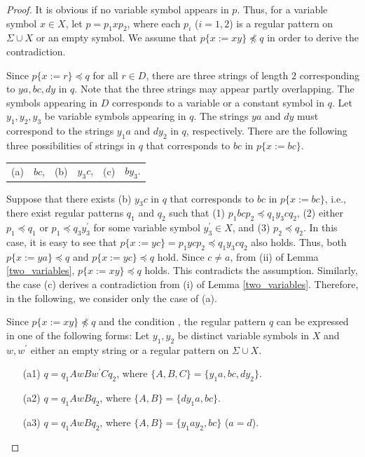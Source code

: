   \begin{proof}
  It is obvious if no variable symbol appears in $p$.
  Thus, for a variable symbol $x\in X$, let $p=p_{1}xp_{2}$, where each $p_{i}$ ($i=1,2$) is a regular pattern on $\Sigma\cup X$ or an empty symbol.
  We assume that $p \{ x := xy \} \not \preceq q$ in order to derive the contradiction.

  Since $p \{ x := r \} \preceq q$ for all $r \in D$, there are three strings of length $2$ corresponding to $ya, bc, dy$ in $q$.
  Note that the three strings may appear partly overlapping.
  The symbols appearing in $D$ corresponds to a variable or a constant symbol in $q$.
  Let $y_{1}, y_{2}, y_{3}$ be variable symbols appearing in $q$.
  The strings $ya$ and $dy$ must correspond to the strings $y_{1}a$ and $dy_{2}$ in $q$, respectively.
  There are the following three possibilities of strings in $q$ that corresponds to $bc$ in $p\{x:=bc\}$.
  \begin{center}
    \begin{tabular}{cccccc}
      \textrm{(a)} & $bc$, & \textrm{(b)} & $y_{3}c$, & \textrm{(c)} & $by_{3}$.
    \end{tabular}
  \end{center}

  Suppose that there exists (b) $y_{3}c$ in $q$ that corresponds to $bc$ in $p\{x:=bc\}$, i.e., there exist regular patterns $q_{1}$ and $q_{2}$ such that (1) $p_{1}bcp_{2} \preceq q_{1}y_{3}cq_{2}$, (2) either $p_{1} \preceq q_{1}$ or $p_{1} \preceq q_{3}y_{3}^{\prime}$ for some variable symbol $y_{3}^{\prime}\in X$, and (3) $p_{2} \preceq q_{2}$.
  In this case, it is easy to see that $p\{x:=yc\} = p_{1}ycp_{2} \preceq q_{1}y_{3}cq_{2}$ also holds. Thus, both $p\{x:=ya\}\preceq q$ and $p\{x:=yc\}\preceq q$ hold. Since $c\not= a$, from (ii) of Lemma \ref{two_variables}, $p\{x:=xy\}\preceq q$ holds. This contradicts the assumption. Similarly, the case (c) derives a contradiction from (i) of Lemma \ref{two_variables}.
  Therefore, in the following, we consider only the case of (a).

  Since $p \{ x := xy \} \not \preceq q$ and the condition \TheConditionA, the regular pattern $q$ can be expressed in one of the following forms: Let $y_{1}, y_{2}$ be distinct variable symbols in $X$ and $w, w^{\prime}$ either an empty string or a regular pattern on $\Sigma\cup X$.
  \begin{enumerate}
  \item[(a1)] $q=q_{1}AwBw^{\prime}Cq_{2}$, where $\{ A,B,C \} = \{ y_{1}a,bc,dy_{2} \}$.
  \item[(a2)] $q=q_{1}AwBq_{2}$, where $\{ A,B \} = \{ dy_{1}a,bc \}$.
  \item[(a3)] $q=q_{1}AwBq_{2}$, where $\{ A,B \} = \{ y_{1}ay_{2},bc \}$ ($a = d$).
  \end{enumerate}
  

\end{proof}
